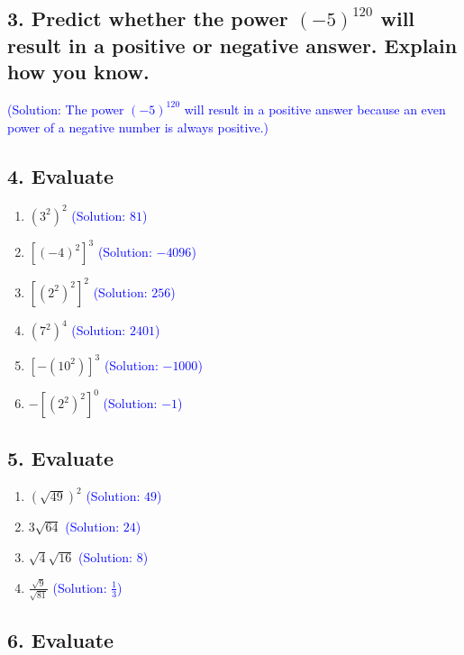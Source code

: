 \documentclass{article}
\begin{document}
\subsection*{3. Predict whether the power $(-5)^{120}$ will result in a positive or negative answer. Explain how you know.}

\noindent\textcolor{blue}{(Solution: The power $(-5)^{120}$ will result in a positive answer because an even power of a negative number is always positive.)}

\subsection*{4. Evaluate}

\begin{enumerate}[label=\textbf{\arabic*.}, align=left, left=0pt, itemsep=5pt]
    \item $\left(3^2\right)^2$ \textcolor{blue}{(Solution: $81$)}
    \item $\left[(-4)^2\right]^3$ \textcolor{blue}{(Solution: $-4096$)}
    \item $\left[\left(2^2\right)^2\right]^2$ \textcolor{blue}{(Solution: $256$)}
    \item $\left(7^2\right)^4$ \textcolor{blue}{(Solution: $2401$)}
    \item $\left[-\left(10^2\right)\right]^3$ \textcolor{blue}{(Solution: $-1000$)}
    \item $-\left[\left(2^2\right)^2\right]^0$ \textcolor{blue}{(Solution: $-1$)}
\end{enumerate}

\subsection*{5. Evaluate}

\begin{enumerate}[label=\textbf{\arabic*.}, align=left, left=0pt, itemsep=5pt]
    \item $(\sqrt{49})^2$ \textcolor{blue}{(Solution: $49$)}
    \item $3 \sqrt{64}$ \textcolor{blue}{(Solution: $24$)}
    \item $\sqrt{4} \sqrt{16}$ \textcolor{blue}{(Solution: $8$)}
    \item $\frac{\sqrt{9}}{\sqrt{81}}$ \textcolor{blue}{(Solution: $\frac{1}{3}$)}
\end{enumerate}
\subsection*{6. Evaluate}
\end{document}
